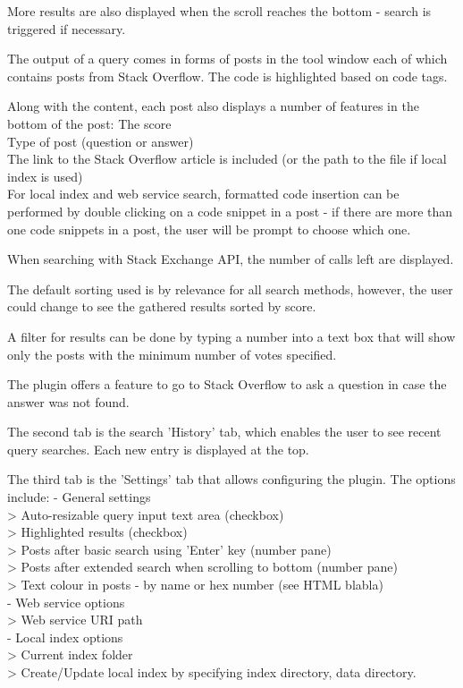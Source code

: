 \documentclass{l4proj}
\begin{document}
More results are also displayed when the scroll reaches the bottom - search is triggered if necessary.

The output of a query comes in forms of posts in the tool window each of
which contains posts from Stack Overflow. The code is highlighted based on code tags.

Along with the content, each post also displays a number of features in the bottom of the post:
The score\\
Type of post (question or answer)\\
The link to the Stack Overflow article is included (or the path to the file if local index is used)\\

For local index and web service search, formatted code insertion can be performed by double clicking on a code snippet in a post - if there are more than one code snippets in a post, the user will be prompt to choose which one.

When searching with Stack Exchange API, the number of calls left are displayed.

The default sorting used is by relevance for all search methods, however, the user could change to see the gathered results sorted by score.

A filter for results can be done by typing a number into a text box that will show only the posts with the minimum number of votes specified.

The plugin offers a feature to go to Stack Overflow to ask a question in case the answer was not found.

The second tab is the search 'History' tab, which enables the user to see recent query searches. Each new entry is displayed at the top.

The third tab is the 'Settings' tab that allows configuring the plugin. The options include:
- General settings\\
> Auto-resizable query input text area (checkbox)\\
> Highlighted results (checkbox)\\
> Posts after basic search using 'Enter' key (number pane)\\
> Posts after extended search when scrolling to bottom (number pane)\\
> Text colour in posts - by name or hex number (see HTML blabla)\\
- Web service options\\
> Web service URI path\\
- Local index options\\
> Current index folder\\
> Create/Update local index by specifying index directory, data directory.\\
\end{document}
